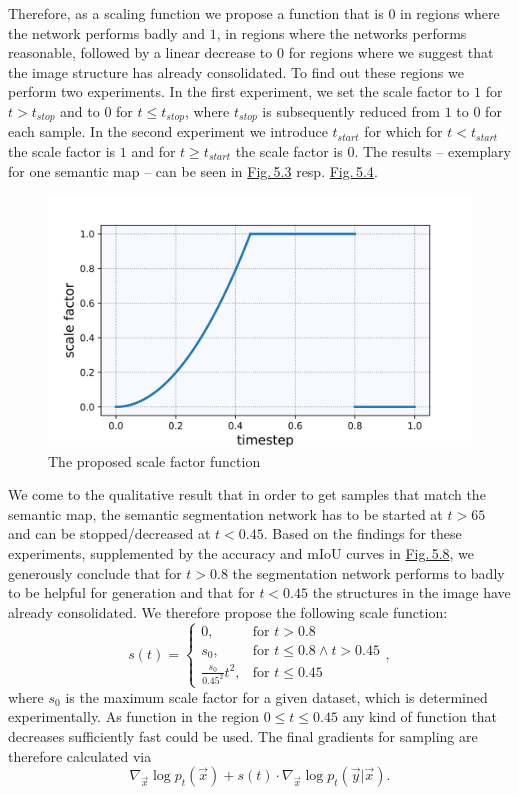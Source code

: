 Therefore, as a scaling function we propose a function that is $0$ in regions where the network performs badly and $1$, in regions where the networks performs reasonable, followed by a linear decrease to $0$ for regions where we suggest that the image structure has already consolidated. To find out these regions we perform two experiments. In the first experiment, we set the scale factor to $1$ for $t>t_{stop}$ and to $0$ for $t\leq t_{stop}$, where $t_{stop}$ is subsequently reduced from $1$ to $0$ for each sample. In the second experiment we introduce $t_{start}$ for which for $t<t_{start}$ the scale factor is $1$ and for $t\geq t_{start}$ the scale factor is $0$. The results – exemplary for one semantic map – can be seen in \hyperref[fig:5.3]{Fig.\,5.3} resp. \hyperref[fig:5.4]{Fig.\,5.4}.

%
\begin{figure} \label{fig:5.2}
    \centering
    \includegraphics[width=.65\textwidth]{Chapters/figures/experiments/scale/scale_function.jpg}
    \caption{The proposed scale factor function}
\end{figure}
%
We come to the qualitative result that in order to get samples that match the semantic map, the semantic segmentation network has to be started at $t>65$ and can be stopped/decreased at $t<0.45$.  Based on the findings for these experiments, supplemented by the accuracy and mIoU curves in \hyperref[fig:5.8]{Fig.\,5.8}, we generously conclude that for $t>0.8$ the segmentation network performs to badly to be helpful for generation and that for $t<0.45$ the structures in the image have already consolidated. We therefore propose the following scale function:
%
\begin{equation} \label{equ:5.5}
    s(t)=\begin{cases}
        0, &\text{for }t>0.8\\
        s_0, &\text{for }t\leq0.8 \land t>0.45\\
        \frac{s_0}{0.45^2}t^2, &\text{for }t\leq0.45
    \end{cases},
\end{equation}
%
where $s_0$ is the maximum scale factor for a given dataset, which is determined experimentally. As function in the region $0\leq t\leq0.45$ any kind of function that decreases sufficiently fast could be used. The final gradients for sampling are therefore calculated via
%
\begin{equation}
    \nabla_{\vec{x}}\log p_t(\vec{x})+s(t)\cdot\nabla_{\vec{x}}\log p_t(\vec{y}|\vec{x}).
\end{equation}

